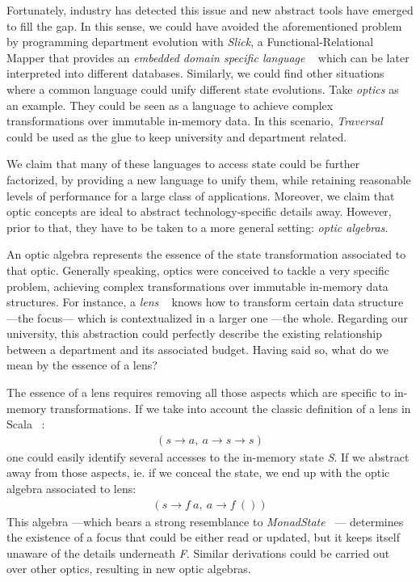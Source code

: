 \documentclass[a4paper]{article}
\begin{document}
Fortunately, industry has detected this issue and new abstract tools have
emerged to fill the gap. In this sense, we could have avoided the aforementioned
problem by programming department evolution with \emph{Slick}, a
Functional-Relational Mapper that provides an \emph{embedded domain specific
language} ~\cite{hudak1996building} which can be later interpreted into
different databases. Similarly, we could find other situations where a common
language could unify different state evolutions. Take \emph{optics} as an
example. They could be seen as a language to achieve complex transformations
over immutable in-memory data. In this scenario, \emph{Traversal}
~\cite{o2011functor} could be used as the glue to keep university and department
related.

We claim that many of these languages to access state could be further
factorized, by providing a new language to unify them, while retaining
reasonable levels of performance for a large class of applications. Moreover, we
claim that optic concepts are ideal to abstract technology-specific details
away. However, prior to that, they have to be taken to a more general setting:
\emph{optic algebras}.


An optic algebra represents the essence of the state transformation associated
to that optic. Generally speaking, optics were conceived to tackle a very
specific problem, achieving complex transformations over immutable in-memory
data structures. For instance, a \emph{lens} ~\cite{foster2005combinators} knows
how to transform certain data structure ---the focus--- which is contextualized
in a larger one ---the whole. Regarding our university, this abstraction could
perfectly describe the existing relationship between a department and its
associated budget. Having said so, what do we mean by the essence of a lens?

The essence of a lens
requires removing all those aspects which are specific to in-memory
transformations. If we take into account the classic definition of a lens in
Scala ~\cite{morris2012asymmetric}:
\begin{align*}
(s \rightarrow a,\ a \rightarrow s \rightarrow s)
\end{align*}
one could easily identify several accesses to the in-memory state \emph{S}. If
we abstract away from those aspects, ie. if we conceal the state, we end up with
the optic algebra associated to lens:
\begin{align*}
(s \rightarrow f\ a,\ a \rightarrow f\ ())
\end{align*}
This algebra ---which bears a strong resemblance to \emph{MonadState}
~\cite{gibbons2012unifying}--- determines the existence of a focus that could be
either read or updated, but it keeps itself unaware of the details underneath
\emph{F}. Similar derivations could be carried out over other optics, resulting
in new optic algebras.
\end{document}
